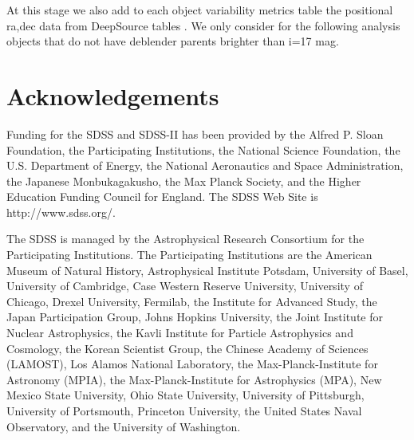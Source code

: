 \documentclass[fleqn,usenatbib]{mnras}  %
\begin{document}
At this stage we also add to each object variability metrics table the positional ra,dec data from DeepSource tables . We only consider for the following analysis objects that do not have deblender parents brighter than i=17 mag. 





\section{}




%







\section*{Acknowledgements}

Funding for the SDSS and SDSS-II has been provided by the Alfred P. Sloan Foundation, the Participating Institutions, the National Science Foundation, the U.S. Department of Energy, the National Aeronautics and Space Administration, the Japanese Monbukagakusho, the Max Planck Society, and the Higher Education Funding Council for England. The SDSS Web Site is http://www.sdss.org/.

The SDSS is managed by the Astrophysical Research Consortium for the Participating Institutions. The Participating Institutions are the American Museum of Natural History, Astrophysical Institute Potsdam, University of Basel, University of Cambridge, Case Western Reserve University, University of Chicago, Drexel University, Fermilab, the Institute for Advanced Study, the Japan Participation Group, Johns Hopkins University, the Joint Institute for Nuclear Astrophysics, the Kavli Institute for Particle Astrophysics and Cosmology, the Korean Scientist Group, the Chinese Academy of Sciences (LAMOST), Los Alamos National Laboratory, the Max-Planck-Institute for Astronomy (MPIA), the Max-Planck-Institute for Astrophysics (MPA), New Mexico State University, Ohio State University, University of Pittsburgh, University of Portsmouth, Princeton University, the United States Naval Observatory, and the University of Washington. 
\end{document}
